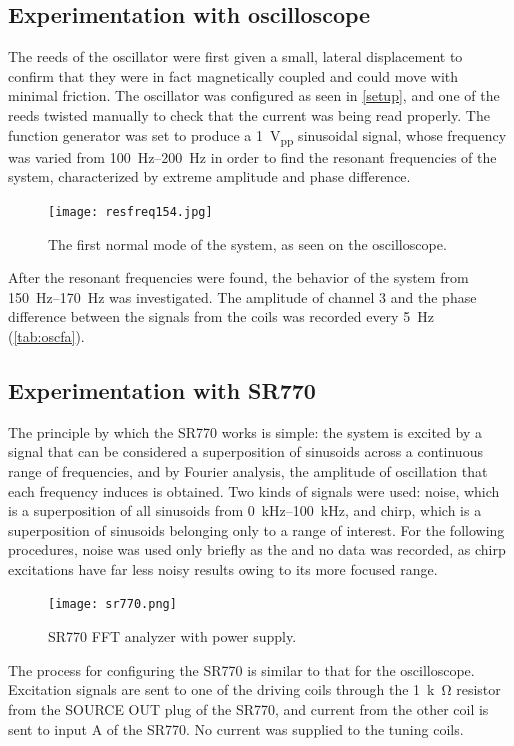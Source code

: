 \documentclass{article}
\begin{document}
\subsection{Experimentation with oscilloscope}
The reeds of the oscillator were first given a small, lateral displacement to confirm that they were in fact magnetically coupled and could move with minimal friction. The oscillator was configured as seen in \autoref{setup}, and one of the reeds twisted manually to check that the current was being read properly. The function generator was set to produce a \qty{1}{V_{pp}} sinusoidal signal, whose frequency was varied from \qtyrange{100}{200}{Hz} in order to find the resonant frequencies of the system, characterized by extreme amplitude and phase difference.
\begin{figure}
  \centering
  \texttt{[image: resfreq154.jpg]}
  \caption{The first normal mode of the system, as seen on the oscilloscope.}
\end{figure}

After the resonant frequencies were found, the behavior of the system from \qtyrange{150}{170}{Hz} was investigated. The amplitude of channel 3 and the phase difference between the signals from the coils was recorded every \qty{5}{Hz} (\autoref{tab:oscfa}).

\subsection{Experimentation with SR770}
The principle by which the SR770 works is simple: the system is excited by a signal that can be considered a superposition of sinusoids across a continuous range of frequencies, and by Fourier analysis, the amplitude of oscillation that each frequency induces is obtained. Two kinds of signals were used: noise, which is a superposition of all sinusoids from \qtyrange{0}{100}{kHz}, and chirp, which is a superposition of sinusoids belonging only to a range of interest. For the following procedures, noise was used only briefly as the and no data was recorded, as chirp excitations have far less noisy results owing to its more focused range.

\begin{figure}
  \centering
  \texttt{[image: sr770.png]}
  \caption{SR770 FFT analyzer with power supply.}
\end{figure}

The process for configuring the SR770 is similar to that for the oscilloscope. Excitation signals are sent to one of the driving coils through the \qty{1}{k\ohm} resistor from the SOURCE OUT plug of the SR770, and current from the other coil is sent to input A of the SR770. No current was supplied to the tuning coils.
\end{document}

